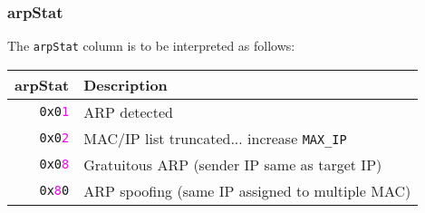 \documentclass[documentation]{subfiles}
\begin{document}
\subsubsection{arpStat}\label{arpStat}
The {\tt arpStat} column is to be interpreted as follows:
\begin{longtable}{rl}
    \toprule
    {\bf arpStat} & {\bf Description}\\
    \midrule\endhead%
    {\tt 0x0\textcolor{magenta}{1}} & ARP detected\\
    {\tt 0x0\textcolor{magenta}{2}} & MAC/IP list truncated... increase {\tt MAX\_IP}\\
    {\tt 0x0\textcolor{magenta}{8}} & Gratuitous ARP (sender IP same as target IP)\\
    {\tt 0x\textcolor{magenta}{8}0} & ARP spoofing (same IP assigned to multiple MAC)\\
    \bottomrule
\end{longtable}
\end{document}
